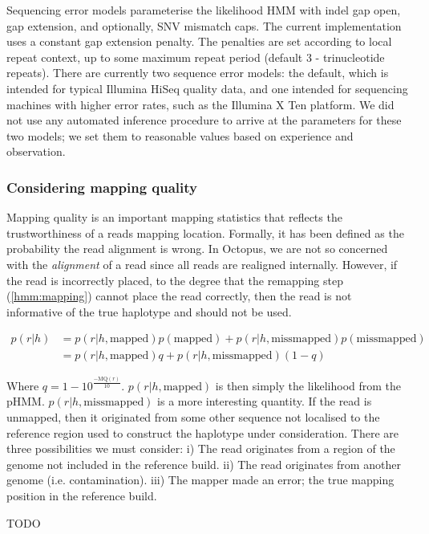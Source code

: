 \documentclass{article}
\begin{document}
Sequencing error models parameterise the likelihood HMM with indel gap open, gap extension, and optionally, SNV mismatch caps. The current implementation uses a constant gap extension penalty. The penalties are set according to local repeat context, up to some maximum repeat period (default 3 - trinucleotide repeats). There are currently two sequence error models: the default, which is intended for typical Illumina HiSeq quality data, and one intended for sequencing machines with higher error rates, such as the Illumina X Ten platform. We did not use any automated inference procedure to arrive at the parameters for these two models; we set them to reasonable values based on experience and observation.

\subsubsection{Considering mapping quality}

Mapping quality is an important mapping statistics that reflects the trustworthiness of a reads mapping location. Formally, it has been defined as the probability the read alignment is wrong. In Octopus, we are not so concerned with the \emph{alignment} of a read since all reads are realigned internally. However, if the read is incorrectly placed, to the degree that the remapping step (\ref{hmm:mapping}) cannot place the read correctly, then the read is not informative of the true haplotype and should not be used. 

\begin{align}
	p(r | h) &= p(r | h, \text{mapped})p(\text{mapped}) + p(r | h, \text{missmapped})p(\text{missmapped})\\
	         &= p(r | h, \text{mapped})q + p(r | h, \text{missmapped})(1 - q)
\end{align}

Where $q = 1 - 10^{\frac{-\text{MQ}(r)}{10}}$. $p(r | h, \text{mapped})$ is then simply the likelihood from the pHMM. $p(r | h, \text{missmapped})$ is a more interesting quantity. If the read is unmapped, then it originated from some other sequence not localised to the reference region used to construct the haplotype under consideration. There are three possibilities we must consider: i) The read originates from a region of the genome not included in the reference build. ii) The read originates from another genome (i.e. contamination). iii) The mapper made an error; the true mapping position in the reference build.

TODO
\end{document}
